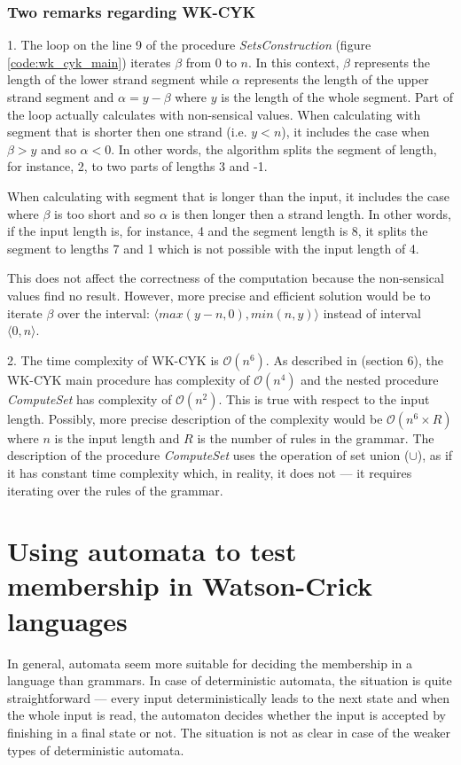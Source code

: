 \subsubsection{Two remarks regarding WK-CYK}
1. The loop on the line 9 of the procedure \textit{SetsConstruction} (figure \ref{code:wk_cyk_main}) iterates $\beta$ from 0 to $n$. In this context, $\beta$ represents the length of the lower strand segment while $\alpha$ represents the length of the upper strand segment and $\alpha = y - \beta$ where $y$ is the length of the whole segment. Part of the loop actually calculates with non-sensical values. When calculating with segment that is shorter then one strand (i.e. $y < n$), it includes the case when $\beta > y$ and so $\alpha < 0$. In other words, the algorithm splits the segment of length, for instance, 2, to two parts of lengths 3 and -1.

When calculating with segment that is longer than the input, it includes the case where $\beta$ is too short and so $\alpha$ is then longer then a strand length. In other words, if the input length is, for instance, 4 and the segment length is 8, it splits the segment to lengths 7 and 1 which is not possible with the input length of 4.

This does not affect the correctness of the computation because the non-sensical values find no result. However, more precise and efficient solution would be to iterate $\beta$ over the interval: $\langle max(y-n, 0), min(n, y)\rangle$ instead of interval $\langle 0, n\rangle$.

\medskip

2. The time complexity of WK-CYK is $\mathcal{O}(n^6)$. As described in \cite{WK_CYK} (section 6), the WK-CYK main procedure has complexity of $\mathcal{O}(n^4)$ and the nested procedure \textit{ComputeSet} has complexity of $\mathcal{O}(n^2)$. This is true with respect to the input length. Possibly, more precise description of the complexity would be $\mathcal{O}(n^6 \times R)$ where $n$ is the input length and $R$ is the number of rules in the grammar. The description of the procedure \textit{ComputeSet} uses the operation of set union ($\cup$), as if it has constant time complexity which, in reality, it does not --- it requires iterating over the rules of the grammar.

\section{Using automata to test membership in Watson-Crick languages}
In general, automata seem more suitable for deciding the membership in a language than grammars. In case of deterministic automata, the situation is quite straightforward --- every input deterministically leads to the next state and when the whole input is read, the automaton decides whether the input is accepted by finishing in a final state or not. The situation is not as clear in case of the weaker types of deterministic automata.


